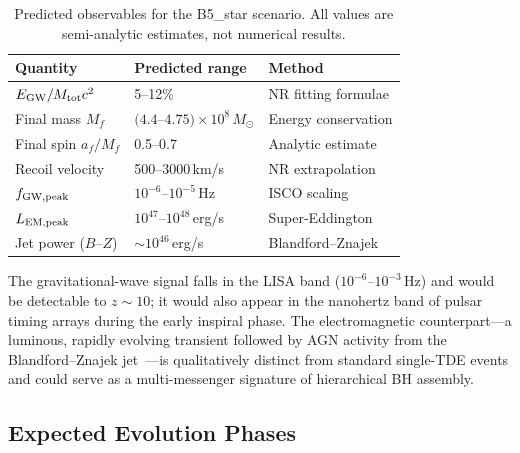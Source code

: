 \documentclass[aps,prd,twocolumn,superscriptaddress,nofootinbib,showpacs,
               longbibliography]{revtex4-2}
\newcommand{\Msun}{M_\odot}
\begin{document}
\begin{table}[t]
\caption{Predicted observables for the B5\_star scenario.
  All values are semi-analytic estimates, not numerical results.}
\label{tab:b5_obs}
\begin{ruledtabular}
\begin{tabular}{lll}
  Quantity & Predicted range & Method \\ \hline
  $E_{\rm GW}/M_{\rm tot}c^2$ & 5--12\% & NR fitting formulae \\
  Final mass $M_f$ & $(4.4$--$4.75)\times10^8\,\Msun$ & Energy conservation \\
  Final spin $a_f/M_f$ & 0.5--0.7 & Analytic estimate \\
  Recoil velocity & 500--3000\,km/s & NR extrapolation \\
  $f_{\rm GW,peak}$ & $10^{-6}$--$10^{-5}$\,Hz & ISCO scaling \\
  $L_{\rm EM,peak}$ & $10^{47}$--$10^{48}$\,erg/s & Super-Eddington \\
  Jet power ($B$--$Z$) & ${\sim}10^{46}$\,erg/s & Blandford--Znajek \\
\end{tabular}
\end{ruledtabular}
\end{table}

The gravitational-wave signal falls in the LISA band
($10^{-6}$--$10^{-3}$\,Hz) and would be detectable to $z \sim 10$; it
would also appear in the nanohertz band of pulsar timing arrays during the
early inspiral phase.
The electromagnetic counterpart---a luminous, rapidly evolving transient
followed by AGN activity from the Blandford--Znajek
jet~\cite{BlandfordZnajek1977}---is qualitatively distinct from standard
single-TDE events and could serve as a multi-messenger signature of
hierarchical BH assembly.

\subsection{Expected Evolution Phases}
\label{sec:b5_phases}
\end{document}
